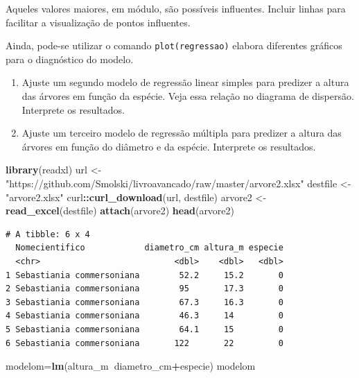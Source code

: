 \documentclass[12pt,brazil,oneside]{book}
\newenvironment{Shaded}{\begin{snugshade}}{\end{snugshade}}
\newcommand{\KeywordTok}[1]{\textcolor[rgb]{0.13,0.29,0.53}{\textbf{#1}}}
\newcommand{\NormalTok}[1]{#1}
\newcommand{\OperatorTok}[1]{\textcolor[rgb]{0.81,0.36,0.00}{\textbf{#1}}}
\newcommand{\StringTok}[1]{\textcolor[rgb]{0.31,0.60,0.02}{#1}}
\begin{document}
Aqueles valores maiores, em módulo, são possíveis influentes. Incluir linhas para facilitar a visualização de pontos influentes.

Ainda, pode-se utilizar o comando \texttt{plot(regressao)} elabora diferentes gráficos para o diagnóstico do modelo.

\begin{enumerate}
\def\labelenumi{\arabic{enumi})}
\setcounter{enumi}{1}
\item
  Ajuste um segundo modelo de regressão linear simples para predizer a altura das árvores em função da espécie. Veja essa relação no diagrama de dispersão. Interprete os resultados.
\item
  Ajuste um terceiro modelo de regressão múltipla para predizer a altura das árvores em função do diâmetro e da espécie. Interprete os resultados.
\end{enumerate}

\begin{Shaded}
\begin{Highlighting}[]
\KeywordTok{library}\NormalTok{(readxl)}
\NormalTok{url <-}\StringTok{ "https://github.com/Smolski/livroavancado/raw/master/arvore2.xlsx"}
\NormalTok{destfile <-}\StringTok{ "arvore2.xlsx"}
\NormalTok{curl}\OperatorTok{::}\KeywordTok{curl_download}\NormalTok{(url, destfile)}
\NormalTok{arvore2 <-}\StringTok{ }\KeywordTok{read_excel}\NormalTok{(destfile)}
\KeywordTok{attach}\NormalTok{(arvore2)}
\KeywordTok{head}\NormalTok{(arvore2)}
\end{Highlighting}
\end{Shaded}

\begin{verbatim}
# A tibble: 6 x 4
  Nomecientifico            diametro_cm altura_m especie
  <chr>                           <dbl>    <dbl>   <dbl>
1 Sebastiania commersoniana        52.2     15.2       0
2 Sebastiania commersoniana        95       17.3       0
3 Sebastiania commersoniana        67.3     16.3       0
4 Sebastiania commersoniana        46.3     14         0
5 Sebastiania commersoniana        64.1     15         0
6 Sebastiania commersoniana       122       22         0
\end{verbatim}

\begin{Shaded}
\begin{Highlighting}[]
\NormalTok{modelom=}\KeywordTok{lm}\NormalTok{(altura_m}\OperatorTok{~}\NormalTok{diametro_cm}\OperatorTok{+}\NormalTok{especie) }
\NormalTok{modelom}
\end{Highlighting}
\end{Shaded}
\end{document}
